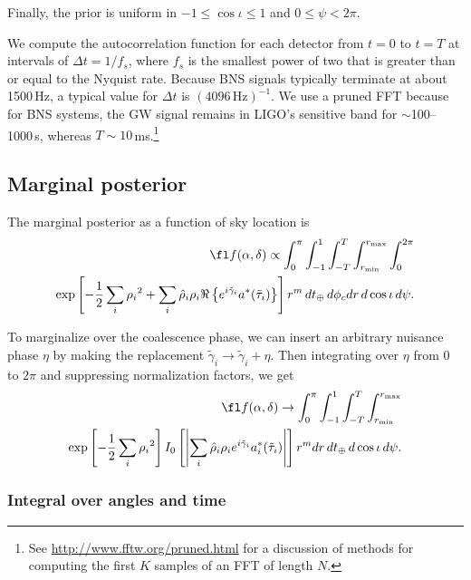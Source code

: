 \documentclass{iopart}
\begin{document}
Finally, the prior is uniform in $-1 \leq \cos\iota \leq 1$ and $0 \leq \psi < 2\pi$.

We compute the autocorrelation function for each detector from $t = 0$ to $t = T$ at intervals of $\Delta t = 1/f_s$, where $f_s$ is the smallest power of two that is greater than or equal to the Nyquist rate. Because BNS signals typically terminate at about 1500\,Hz, a typical value for $\Delta t$ is $(4096\,\textrm{Hz})^{-1}$. We use a pruned \ac{FFT} because for BNS systems, the GW signal remains in LIGO's sensitive band for $\sim$100\nobreakdashes--1000\,s, whereas $T \sim 10$\,ms.\footnote{See \url{http://www.fftw.org/pruned.html} for a discussion of methods for computing the first $K$ samples of an \ac{FFT} of length $N$.}

\subsection{Marginal posterior}

The marginal posterior as a function of sky location is
%
\begin{eqnarray}
    \fl f(\alpha, \delta) \propto
    \int_{0}^{\pi}
    \int_{-1}^{1}
    \int_{-T}^{T}
    \int_{r_\mathrm{min}}^{r_\mathrm{max}}
    \int_{0}^{2\pi} \\
    \exp \left[ - \frac{1}{2} \sum_i {\rho_i}^2
        + \sum_i \hat\rho_i \rho_i \Re \left\{ e^{i \tilde{\gamma}_i}
        a^*(\tilde{\tau}_i)
        \right\}
    \right] r^m \, dt_\oplus \, d\phi_c dr \, d\cos{\iota} \, d\psi.
\end{eqnarray}

To marginalize over the coalescence phase, we can insert an arbitrary nuisance phase $\eta$ by making the replacement $\tilde{\gamma}_i \rightarrow \tilde{\gamma}_i + \eta$. Then integrating over $\eta$ from $0$ to $2\pi$ and suppressing normalization factors, we get
%
\begin{eqnarray}
    \fl f(\alpha, \delta) \rightarrow
    \int_{0}^{\pi}
    \int_{-1}^{1}
    \int_{-T}^{T}
    \int_{r_\mathrm{min}}^{r_\mathrm{max}} \\
    \exp \left[ - \frac{1}{2} \sum_i {\rho_i}^2 \right] I_0 \left[
            \left| \sum_i \hat\rho_i \rho_i e^{i \tilde{\gamma}_i} a_i^*(\tilde{\tau}_i)
            \right|
    \right]
    r^m dr \, dt_\oplus \, d\cos{\iota} \, d\psi.
\end{eqnarray}

\subsubsection{Integral over angles and time}
\end{document}
